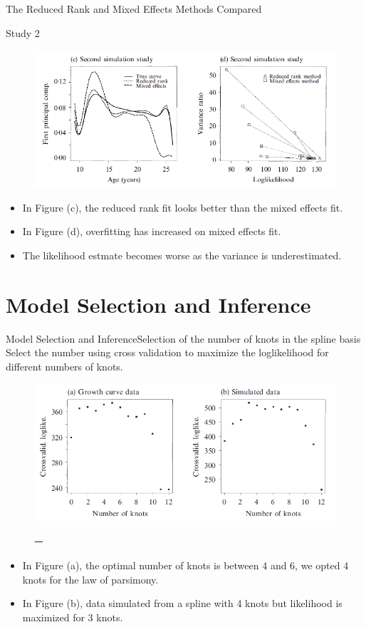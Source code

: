 \documentclass{beamer}
\begin{document}
\begin{frame}{The Reduced Rank and Mixed Effects Methods Compared}
	\begin{block}{Study 2}
		\begin{figure}[h] %
			\begin{center}
				\includegraphics[width=0.7\linewidth]{img/6.png}
			\end{center}
			\label{fig:long}
			\label{fig:onecol}
		\end{figure}
		\begin{itemize}
			\item {
				In Figure (c), the reduced rank fit looks better than the mixed effects fit.
			}
			\item {
				In Figure (d), overfitting has increased on mixed effects fit.
			}
			\item {
				The likelihood estmate becomes worse as the variance is underestimated.
			}
		\end{itemize}
	\end{block}
\end{frame}


\section{Model Selection and Inference}
\begin{frame}{Model Selection and Inference}{Selection of the number of knots in the spline basis}
	Select the number using cross validation to maximize the loglikelihood for different numbers of knots.
	\begin{figure}[h] %
		\begin{center}
			\includegraphics[width=0.7\linewidth]{img/7.png}
		\end{center}
		\label{fig:long}ㅡ
		\label{fig:onecol}
	\end{figure}
	\begin{itemize}
		\item {
			In Figure (a), the optimal number of knots is between 4 and 6, we opted 4 knots for the law of parsimony.
		}
		\item {
			In Figure (b), data simulated from a spline with 4 knots but likelihood is maximized for 3 knots.
		}
	\end{itemize}
\end{frame}
\end{document}
